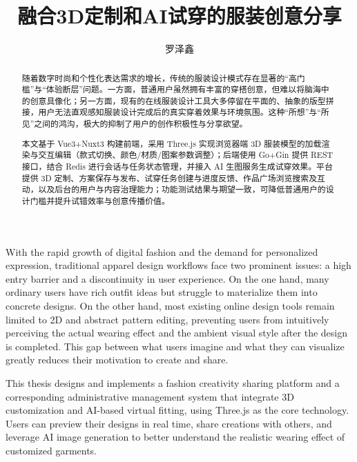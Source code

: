 \documentclass[twoside]{thesis-cls-Miya} %
\begin{document}
	
\title{融合3D定制和AI试穿的服装创意分享}

\author{罗泽鑫}


\maketitle

\frontmatter

\begin{abstract}
随着数字时尚和个性化表达需求的增长，传统的服装设计模式存在显著的“高门槛”与“体验断层”问题。一方面，普通用户虽然拥有丰富的穿搭创意，但难以将脑海中的创意具像化；另一方面，现有的在线服装设计工具大多停留在平面的、抽象的版型拼接，用户无法直观感知服装设计完成后的真实穿着效果与环境氛围。这种“所想”与“所见”之间的鸿沟，极大的抑制了用户的创作积极性与分享欲望。

本文基于 Vue3+Nuxt3 构建前端，采用 Three.js 实现浏览器端 3D 服装模型的加载渲染与交互编辑（款式切换、颜色/材质/图案参数调整）；后端使用 Go+Gin 提供 REST 接口，结合 Redis 进行会话与任务状态管理，并接入 AI 生图服务生成试穿效果。平台提供 3D 定制、方案保存与发布、试穿任务创建与进度反馈、作品广场浏览搜索及互动，以及后台的用户与内容治理能力；功能测试结果与期望一致，可降低普通用户的设计门槛并提升试错效率与创意传播价值。

\end{abstract}

\begin{englishabstract}
With the rapid growth of digital fashion and the demand for personalized expression, traditional apparel design workflows face two prominent issues: a high entry barrier and a discontinuity in user experience. On the one hand, many ordinary users have rich outfit ideas but struggle to materialize them into concrete designs. On the other hand, most existing online design tools remain limited to 2D and abstract pattern editing, preventing users from intuitively perceiving the actual wearing effect and the ambient visual style after the design is completed. This gap between what users imagine and what they can visualize greatly reduces their motivation to create and share.

This thesis designs and implements a fashion creativity sharing platform and a corresponding administrative management system that integrate 3D customization and AI-based virtual fitting, using Three.js as the core technology. Users can preview their designs in real time, share creations with others, and leverage AI image generation to better understand the realistic wearing effect of customized garments.

\end{englishabstract}
\end{document}
